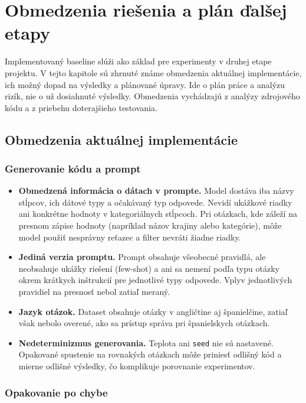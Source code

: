 \section{Obmedzenia riešenia a plán ďalšej etapy}

Implementovaný baseline slúži ako základ pre experimenty v druhej etape projektu. V tejto kapitole sú zhrnuté známe obmedzenia aktuálnej implementácie, ich možný dopad na výsledky a plánované úpravy. Ide o plán práce a analýzu rizík, nie o už dosiahnuté výsledky. Obmedzenia vychádzajú z analýzy zdrojového kódu a z priebehu doterajšieho testovania.

\subsection{Obmedzenia aktuálnej implementácie}

\subsubsection*{Generovanie kódu a prompt}

\begin{itemize}
    \item \textbf{Obmedzená informácia o dátach v prompte.} Model dostáva iba názvy stĺpcov, ich dátové typy a očakávaný typ odpovede. Nevidí ukážkové riadky ani konkrétne hodnoty v kategoriálnych stĺpcoch. Pri otázkach, kde záleží na presnom zápise hodnoty (napríklad názov krajiny alebo kategórie), môže model použiť nesprávny reťazec a filter nevráti žiadne riadky.
    \item \textbf{Jediná verzia promptu.} Prompt obsahuje všeobecné pravidlá, ale neobsahuje ukážky riešení (few-shot) a ani sa nemení podľa typu otázky okrem krátkych inštrukcií pre jednotlivé typy odpovede. Vplyv jednotlivých pravidiel na presnosť nebol zatiaľ meraný.
    \item \textbf{Jazyk otázok.} Dataset obsahuje otázky v angličtine aj španielčine, zatiaľ však nebolo overené, ako sa prístup správa pri španielskych otázkach.
    \item \textbf{Nedeterminizmus generovania.} Teplota ani \texttt{seed} nie sú nastavené. Opakované spustenie na rovnakých otázkach môže priniesť odlišný kód a mierne odlišné výsledky, čo komplikuje porovnanie experimentov.
\end{itemize}

\subsubsection*{Opakovanie po chybe}

